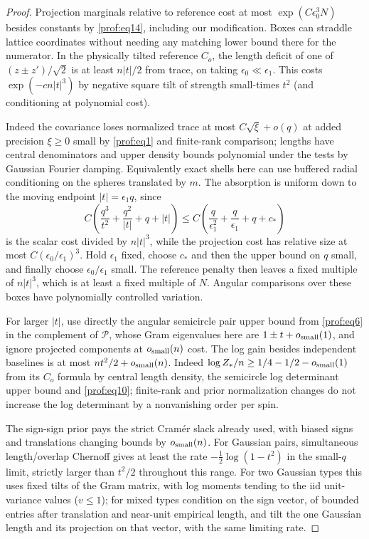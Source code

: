 \begin{proof}
Projection marginals relative to reference cost at most \(\exp(C\epsilon_0^3 N)\) besides constants by \eqref{prof:eq14}, including our modification. Boxes can straddle lattice coordinates without needing any matching lower bound there for the numerator. In the physically tilted reference \(C_o\), the length deficit of one of \((z\pm z')/\sqrt2\) is at least \(n|t|/2\) from trace, on taking \(\epsilon_0\ll\epsilon_1\). This costs \(\exp(-c n |t|^3)\) by negative square tilt of strength small-times \(t^2\) (and conditioning at polynomial cost).

Indeed the covariance loses normalized trace at most \(C\sqrt{\xi}+o(q)\) at added precision \(\xi\ge0\) small by \eqref{prof:eq1} and finite-rank comparison; lengths have central denominators and upper density bounds polynomial under the tests by Gaussian Fourier damping. Equivalently exact shells here can use buffered radial conditioning on the spheres translated by \(m\).
The absorption is uniform down to the moving endpoint
\(|t|=\epsilon_1q\), since
\[
 C\left(\frac{q^3}{t^2}+\frac{q^2}{|t|}+q+|t|\right)
 \le C\left(\frac q{\epsilon_1^2}+\frac q{\epsilon_1}+q+c_*\right)
\]
is the scalar cost divided by \(n|t|^3\), while the projection cost
has relative size at most \(C(\epsilon_0/\epsilon_1)^3\).
Hold \(\epsilon_1\) fixed, choose \(c_*\) and then the upper bound
on \(q\) small, and finally choose \(\epsilon_0/\epsilon_1\) small.
The reference penalty then leaves a fixed multiple of \(n|t|^3\),
which is at least a fixed multiple of \(N\). Angular comparisons
over these boxes have polynomially controlled variation.

For larger \(|t|\), use directly the angular semicircle pair upper bound from \eqref{prof:eq6} in the complement of \(\mathcal P\), whose Gram eigenvalues here are \(1\pm t+o_{\rm small}(1)\), and ignore projected components at \(o_{\rm small}(n)\) cost. The log gain besides independent baselines is at most \(nt^2/2+o_{\rm small}(n)\). Indeed \(\log Z_*/n\ge1/4-1/2-o_{\rm small}(1)\) from its \(C_o\) formula by central length density, the semicircle log determinant upper bound and \eqref{prof:eq10}; finite-rank and prior normalization changes do not increase the log determinant by a nonvanishing order per spin.

The sign-sign prior pays the strict Cramér slack already used, with biased signs and translations changing bounds by \(o_{\rm small}(n)\). For Gaussian pairs, simultaneous length/overlap Chernoff gives at least the rate \(-\frac12\log(1-t^2)\) in the small-\(q\) limit, strictly larger than \(t^2/2\) throughout this range. For two Gaussian types this uses fixed tilts of the Gram matrix, with log moments tending to the iid unit-variance values (\(v\le1\)); for mixed types condition on the sign vector, of bounded entries after translation and near-unit empirical length, and tilt the one Gaussian length and its projection on that vector, with the same limiting rate.


\end{proof}
